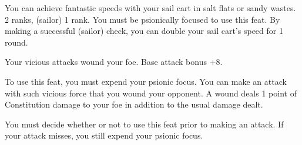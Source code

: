 {You can achieve fantastic speeds with your sail cart in salt flats or sandy wastes.}
{ 2 ranks,  (sailor) 1 rank.}
{You must be psionically focused to use this feat. By making a successful  (sailor) check, you can double your sail cart's speed for 1 round.}
{}{}

{Your vicious attacks wound your foe.}
{Base attack bonus +8.}
{To use this feat, you must expend your psionic focus. You can make an attack with such vicious force that you wound your opponent. A wound deals 1 point of Constitution damage to your foe in addition to the usual damage dealt.

You must decide whether or not to use this feat prior to making an attack. If your attack misses, you still expend your psionic focus.}
{}{}
